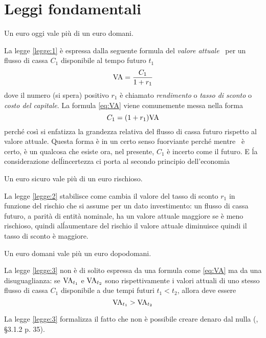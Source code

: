 
\chapter{Leggi fondamentali}
\label{chap:Leggi_fondamentali}

\begin{legge}\label{legge:1}
  Un euro oggi vale più di un euro domani.
\end{legge}

La legge \ref{legge:1} è espressa dalla seguente formula del \emph{valore attuale}
\VA\ per un flusso di cassa  $C_1$ disponibile al tempo futuro $t_1$
\begin{equation}
  \label{eq:VA}
  \mathrm{VA}=\frac{C_1}{1+r_1}
\end{equation}
dove il numero (si spera) positivo $r_1$ è chiamato \emph{rendimento} o \emph{tasso di sconto} o
\emph{costo del capitale}.
La formula \eqref{eq:VA} viene comunemente messa nella forma
\[
  C_1=(1+r_1)\mathrm{VA}
\]
perché così si enfatizza la grandezza relativa del flusso di cassa futuro rispetto al valore attuale.
Questa forma è in un certo senso fuorviante perché mentre \VA\ è certo, è un qualcosa che esiste ora,
nel presente, $C_1$ è incerto come il futuro. E ĺa considerazione delĺincertezza ci porta al secondo
principio dell'economia

\begin{legge}\label{legge:2}
  Un euro sicuro vale più di un euro rischioso.  
\end{legge}

La legge \ref{legge:2} stabilisce come cambia il valore del tasso di sconto $r_1$ in funzione del
rischio che si assume per un dato investimento: un flusso di cassa futuro, a parità di entità nominale,
ha un valore attuale maggiore se è meno rischioso, quindi alĺaumentare del rischio il valore attuale
diminuisce quindi il tasso di sconto è maggiore.

\begin{legge}\label{legge:3}
  Un euro domani vale più un euro dopodomani.
\end{legge}

La legge \ref{legge:3} non è di solito espressa da una formula come \eqref{eq:VA} ma da una disuguaglianza:
se $\mathrm{VA}_{t_1}$ e $\mathrm{VA}_{t_2}$ sono rispettivamente i valori attuali di uno stesso flusso di cassa $C_1$ disponibile
a due tempi futuri $t_1<t_2$, allora deve essere
\begin{equation}
  \label{eq:legge2}
  \mathrm{VA}_{t_1}>\mathrm{VA}_{t_2}
\end{equation}

La legge \ref{legge:3} formalizza il fatto che non è possibile creare denaro dal nulla (\cite{brealey_et_al1999},
§3.1.2 p. 35).